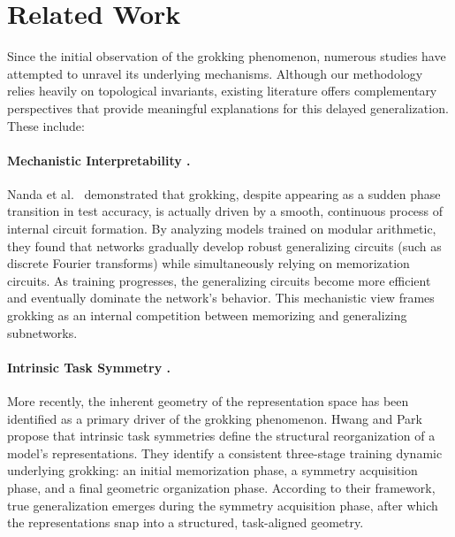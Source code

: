 \section{Related Work}

Since the initial observation of the grokking phenomenon, numerous studies have attempted to unravel its underlying mechanisms. Although our methodology relies heavily on topological invariants, existing literature offers complementary perspectives that provide meaningful explanations for this delayed generalization. These include:

\paragraph{Mechanistic Interpretability \cite{nanda2023progressmeasuresgrokkingmechanistic}.} 
Nanda et al.~\cite{nanda2023progressmeasuresgrokkingmechanistic} demonstrated that grokking, despite appearing as a sudden phase transition in test accuracy, is actually driven by a smooth, continuous process of internal circuit formation. By analyzing models trained on modular arithmetic, they found that networks gradually develop robust generalizing circuits (such as discrete Fourier transforms) while simultaneously relying on memorization circuits. As training progresses, the generalizing circuits become more efficient and eventually dominate the network's behavior. This mechanistic view frames grokking as an internal competition between memorizing and generalizing subnetworks.

\paragraph{Intrinsic Task Symmetry \cite{hwang2026intrinsic}.}
More recently, the inherent geometry of the representation space has been identified as a primary driver of the grokking phenomenon. Hwang and Park~\cite{hwang2026intrinsic} propose that intrinsic task symmetries define the structural reorganization of a model's representations. They identify a consistent three-stage training dynamic underlying grokking: an initial memorization phase, a symmetry acquisition phase, and a final geometric organization phase. According to their framework, true generalization emerges during the symmetry acquisition phase, after which the representations snap into a structured, task-aligned geometry.

